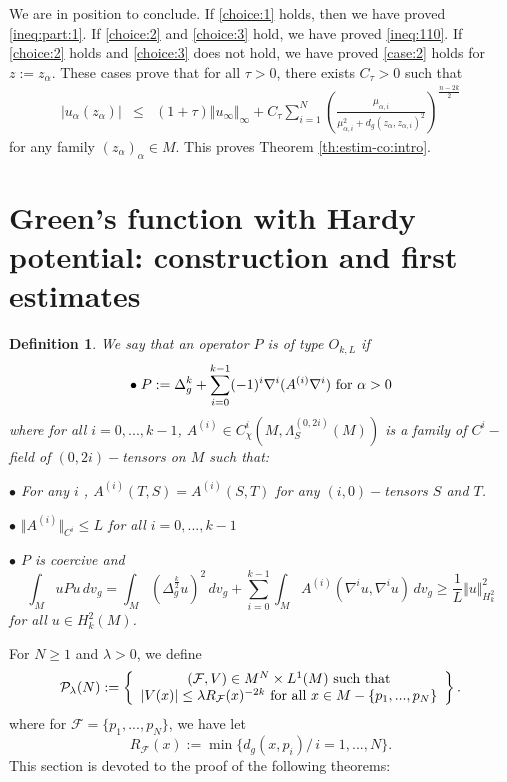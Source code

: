 \documentclass[reqno]{amsart}
\newtheorem{defi}{Definition}[section]
\def \Pl {{\mathcal P}_\lambda}
\def \Mmx {M - \{p_1,...,p_N\}}
\def \ua {u_\alpha}
\def \F {{\mathcal F}}
\def \za {z_\alpha}
\def \mai {\mu_{\alpha,i}}
\def \zai {z_{\alpha,i}}
\begin{document}
\smallskip\noindent We are in position to conclude. If \eqref{choice:1} holds, then we have proved \eqref{ineq:part:1}. If  \eqref{choice:2}  and \eqref{choice:3} hold, we have proved \eqref{ineq:110}. If  \eqref{choice:2} holds and \eqref{choice:3} does not hold, we have proved  \eqref{case:2} holds for $z:=z_\alpha$. These cases prove that for all $\tau>0$, there exists $C_\tau>0$ such that 
\begin{eqnarray*}
|\ua(\za)|&\leq& (1+\tau)\Vert u_\infty \Vert_\infty+C_\tau\sum_{i=1}^N \left(\frac{\mai}{\mai^2+d_g(\za,\zai)^2}\right)^{\frac{n-2k}{2}} 
\end{eqnarray*}
for any family $(\za)_\alpha\in M$. This proves Theorem \ref{th:estim-co:intro}.
 


\section{Green's function with Hardy potential: construction and first estimates}\label{sec:green1}
\begin{defi}\label{def:p} We say that an operator $P$ is of type $O_{k,L}$ if
$$\bullet\; P:=\Delta_g^k+\sum_{i=0}^{k-1} (-1)^i\nabla^i(A^{(i)} \nabla^i)\hbox{ for }\alpha>0$$
where for all $i=0,...,k-1$, $ A^{(i)}\in C^{i}_{\chi}(M,\Lambda_{S}^{(0,2i)}(M))$ is a family of $C^{i}-$field of $(0,2i)-$tensors on $M$ such that:\par
$\bullet$ For any $i$ , $A^{(i)}(T,S)=A^{(i)}(S,T)$ for any $(i,0)-$tensors $S$ and $T$. \par
$\bullet$ $\Vert A^{(i)}\Vert_{C^{i}}\leq L$ for all $i=0,...,k-1$\par
$\bullet$ $P$ is  coercive and 
$$\int_M u P u\, dv_g=\int_M (\Delta_g^{\frac{k}{2}}u)^2\, dv_g+\sum_{i=0}^{k-1}\int_M A^{(i)} (\nabla^iu,\nabla^i u)\, dv_g\geq \frac{1}{L}\Vert u\Vert_{H_k^2}^2$$
for all $u\in H_k^2(M)$.\end{defi}
For $N\geq 1$  and $\lambda>0$, we define
\begin{equation*}
\Pl(N):=\left\{\begin{array}{cc}
(\F, V)\in M^N\times L^1(M)\hbox{ such that}\\
|V(x)|\leq \lambda R_{\mathcal F}(x)^{-2k}\hbox{ for all }x\in \Mmx\end{array}\right\}.
\end{equation*}
where for $\F=\{p_1,...,p_N\}$, we have let
$$R_{\mathcal F}(x):=\min\{d_g(x,p_i)/\, i=1,...,N\}.$$
This section is devoted to the proof of the following theorems:
\end{document}
